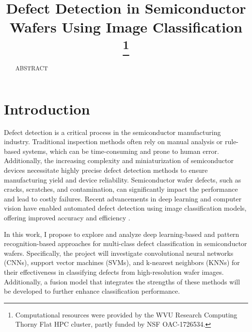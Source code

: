 \documentclass[conference]{IEEEtran}
\begin{document}
\title{
    Defect Detection in Semiconductor Wafers Using Image Classification
    \thanks{Computational resources were provided by the WVU Research Computing Thorny Flat HPC cluster, partly funded by NSF OAC-1726534.}
}

\author{
}

\maketitle
\thispagestyle{plain}
\pagestyle{plain}

\begin{abstract}
    ABSTRACT
\end{abstract}

\section{Introduction}
Defect detection is a critical process in the semiconductor manufacturing industry. 
Traditional inspection methods often rely on manual analysis or rule-based systems, which can be time-consuming and prone to human error.
Additionally, the increasing complexity and miniaturization of semiconductor devices necessitate highly precise defect detection methods to ensure manufacturing yield and device reliability.
Semiconductor wafer defects, such as cracks, scratches, and contamination, can significantly impact the performance and lead to costly failures. 
Recent advancements in deep learning and computer vision have enabled automated defect detection using image classification models, offering improved accuracy and efficiency \cite{b1}.

In this work, I propose to explore and analyze deep learning-based and pattern recognition-based approaches for multi-class defect classification in semiconductor wafers. 
Specifically, the project will investigate convolutional neural networks (CNNs), support vector machines (SVMs), and k-nearest neighbors (KNNs) for their effectiveness in classifying defects from high-resolution wafer images. 
Additionally, a fusion model that integrates the strengths of these methods will be developed to further enhance classification performance.
\end{document}
